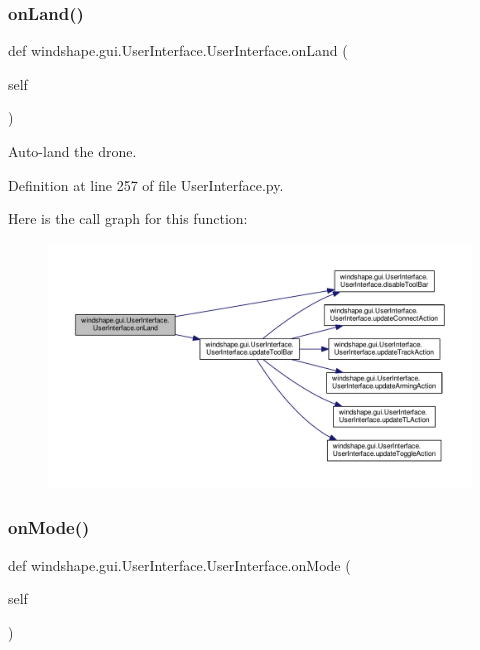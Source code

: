 \subsubsection{\texorpdfstring{on\+Land()}{onLand()}}
{\footnotesize\ttfamily def windshape.\+gui.\+User\+Interface.\+User\+Interface.\+on\+Land (\begin{DoxyParamCaption}\item[{}]{self }\end{DoxyParamCaption})}

\begin{DoxyVerb}Auto-land the drone.\end{DoxyVerb}
 

Definition at line 257 of file User\+Interface.\+py.

Here is the call graph for this function\+:\nopagebreak
\begin{figure}[H]
\begin{center}
\leavevmode
\includegraphics[width=350pt]{classwindshape_1_1gui_1_1_user_interface_1_1_user_interface_a53a63252e00a919480b45dec74cffc5e_cgraph}
\end{center}
\end{figure}
\mbox{\label{classwindshape_1_1gui_1_1_user_interface_1_1_user_interface_a21c27cfeeef61034950c762af6b54d6e}} 
\subsubsection{\texorpdfstring{on\+Mode()}{onMode()}}
{\footnotesize\ttfamily def windshape.\+gui.\+User\+Interface.\+User\+Interface.\+on\+Mode (\begin{DoxyParamCaption}\item[{}]{self }\end{DoxyParamCaption})}

